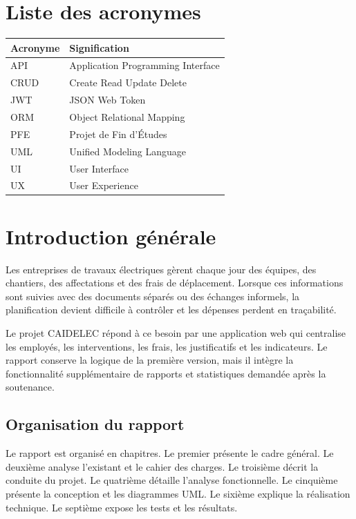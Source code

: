 \documentclass[12pt,a4paper,oneside]{report}
\begin{document}
\tableofcontents
\listoffigures
\listoftables

\chapter*{Liste des acronymes}
\begin{longtable}{p{3cm}p{10cm}}
\toprule
\textbf{Acronyme} & \textbf{Signification}\\
\midrule
API & Application Programming Interface\\
CRUD & Create Read Update Delete\\
JWT & JSON Web Token\\
ORM & Object Relational Mapping\\
PFE & Projet de Fin d'Études\\
UML & Unified Modeling Language\\
UI & User Interface\\
UX & User Experience\\
\bottomrule
\end{longtable}

\clearpage
{}

\chapter*{Introduction générale}
Les entreprises de travaux électriques gèrent chaque jour des équipes, des chantiers, des affectations et des frais de déplacement. Lorsque ces informations sont suivies avec des documents séparés ou des échanges informels, la planification devient difficile à contrôler et les dépenses perdent en traçabilité.

Le projet CAIDELEC répond à ce besoin par une application web qui centralise les employés, les interventions, les frais, les justificatifs et les indicateurs. Le rapport conserve la logique de la première version, mais il intègre la fonctionnalité supplémentaire de rapports et statistiques demandée après la soutenance.

\section*{Organisation du rapport}
Le rapport est organisé en chapitres. Le premier présente le cadre général. Le deuxième analyse l'existant et le cahier des charges. Le troisième décrit la conduite du projet. Le quatrième détaille l'analyse fonctionnelle. Le cinquième présente la conception et les diagrammes UML. Le sixième explique la réalisation technique. Le septième expose les tests et les résultats.
\end{document}
